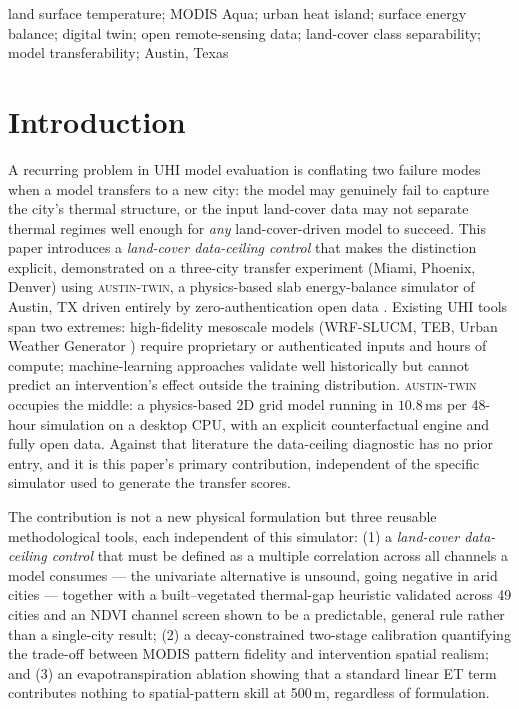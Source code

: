 \documentclass[conference]{IEEEtran}
\begin{document}
\begin{IEEEkeywords}
land surface temperature; MODIS Aqua; urban heat island; surface energy
balance; digital twin; open remote-sensing data; land-cover class
separability; model transferability; Austin, Texas
\end{IEEEkeywords}

\section{Introduction}

A recurring problem in UHI model evaluation is conflating two failure
modes when a model transfers to a new city: the model may genuinely fail
to capture the city's thermal structure, or the input land-cover data may
not separate thermal regimes well enough for \emph{any} land-cover-driven
model to succeed. This paper introduces a \emph{land-cover data-ceiling
control} that makes the distinction explicit, demonstrated on a
three-city transfer experiment (Miami, Phoenix, Denver) using
\textsc{austin-twin}, a physics-based slab energy-balance simulator of
Austin, TX driven entirely by zero-authentication open data
\cite{oke1982energetic, voogt2003thermal, masson2000physically}. Existing
UHI tools span two extremes: high-fidelity mesoscale models (WRF-SLUCM,
TEB, Urban Weather Generator \cite{bueno2013urban, kusaka2001simple})
require proprietary or authenticated inputs and hours of compute;
machine-learning approaches \cite{lyu2022integrated, hoang2025geospatial,
bhamjee2024detection} validate well historically but cannot predict an
intervention's effect outside the training distribution.
\textsc{austin-twin} occupies the middle: a physics-based 2D grid model
running in $10.8$\,ms per 48-hour simulation on a desktop CPU, with an
explicit counterfactual engine and fully open data. Against that
literature the data-ceiling diagnostic has no prior entry, and it is this
paper's primary contribution, independent of the specific simulator used
to generate the transfer scores.

The contribution is not a new physical formulation but three reusable
methodological tools, each independent of this simulator: (1) a
\emph{land-cover data-ceiling control} that must be defined as a multiple
correlation across all channels a model consumes — the univariate
alternative is unsound, going negative in arid cities — together with a
built--vegetated thermal-gap heuristic validated across 49 cities and an
NDVI channel screen shown to be a predictable, general rule rather than a
single-city result; (2) a decay-constrained two-stage calibration
quantifying the trade-off between MODIS pattern fidelity and intervention
spatial realism; and (3) an evapotranspiration ablation showing that a
standard linear ET term contributes nothing to spatial-pattern skill at
500\,m, regardless of formulation.
\end{document}
